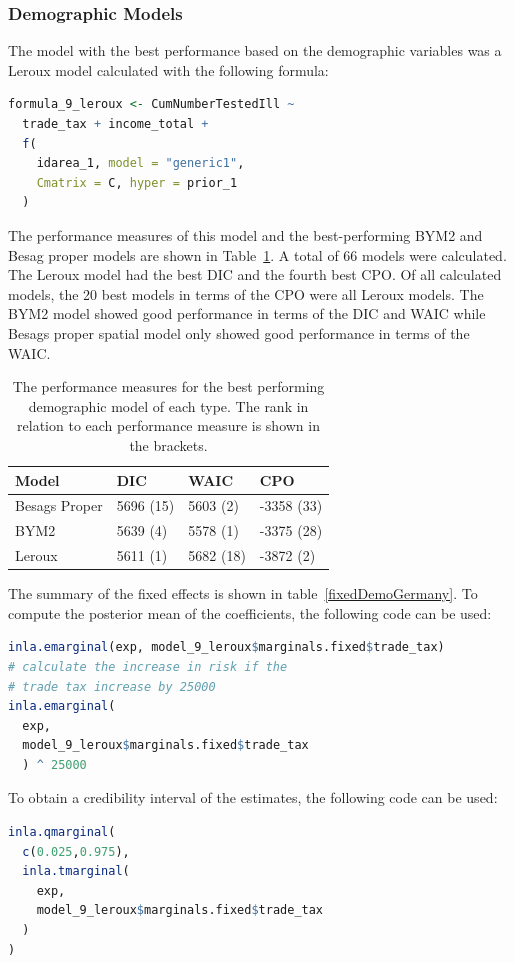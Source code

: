 \subsubsection{Demographic Models}
The model with the best performance based on the demographic variables was a Leroux model calculated with the following formula:
\begin{lstlisting}[language=R]
formula_9_leroux <- CumNumberTestedIll ~
  trade_tax + income_total +
  f(
    idarea_1, model = "generic1",
    Cmatrix = C, hyper = prior_1
  )
\end{lstlisting}
The performance measures of this model and the best-performing BYM2 and Besag proper models are shown in Table~\ref{demoGermany}. A total of 66 models were calculated. The Leroux model had the best DIC and the fourth best CPO. Of all calculated models, the 20 best models in terms of the CPO were all Leroux models. The BYM2 model showed good performance in terms of the DIC and WAIC while Besags proper spatial model only showed good performance in terms of the WAIC.
\begin{table}[H] 
\caption{The performance measures for the best performing demographic model of each type. The rank in relation to each performance measure is shown in the brackets. \label{demoGermany}}
\begin{tabular}{l l l l}
\toprule
\textbf{Model}	& \textbf{DIC}	& \textbf{WAIC} & \textbf{CPO} \\
\midrule
Besags Proper  & 5696 (15) & 5603 (2) & -3358 (33) \\
BYM2 & 5639 (4) & 5578 (1) & -3375 (28)\\
Leroux & 5611 (1) & 5682 (18) & -3872 (2) \\
\bottomrule
\end{tabular}
\end{table}
The summary of the fixed effects is shown in table~\ref{fixedDemoGermany}. To compute the posterior mean of the coefficients, the following code can be used:
\begin{lstlisting}[language=R]
inla.emarginal(exp, model_9_leroux$marginals.fixed$trade_tax)
# calculate the increase in risk if the 
# trade tax increase by 25000
inla.emarginal(
  exp,
  model_9_leroux$marginals.fixed$trade_tax
  ) ^ 25000
\end{lstlisting}
To obtain a credibility interval of the estimates, the following code can be used:
\begin{lstlisting}[language=R]
inla.qmarginal(
  c(0.025,0.975),
  inla.tmarginal(
    exp,
    model_9_leroux$marginals.fixed$trade_tax
  )
)
\end{lstlisting}
